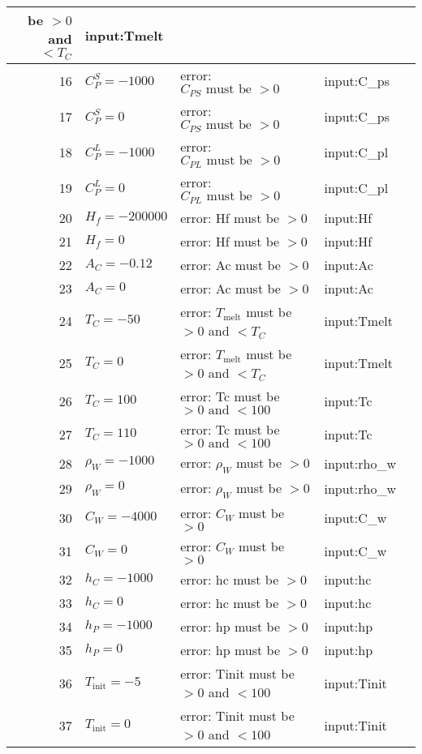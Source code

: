 \documentclass[12pt]{article}
\begin{document}
\begin{center}
\begin{longtable}{ | r | p{4cm} | p{4cm} | p{4cm} | p{4cm} |}
	 be $> 0$ and $< T_C$ &input:Tmelt \\ \hline
	16 & $C^S_P = -1000$ & error: $C_{PS} \text{ must be } > 0$ &input:C\_{ps} \\ \hline
	17 & $C^S_P = 0$ & error: $C_{PS} \text{ must be } > 0$ &input:C\_{ps} \\ \hline
	18 & $C^L_P = -1000$ & error: $C_{PL} \text{ must be } > 0$ &input:C\_{pl} \\ \hline
	19 & $C^L_P = 0$ & error: $C_{PL} \text{ must be } > 0$ &input:C\_{pl} \\ \hline
	20 & $H_f = -200000$& error: Hf must be $> 0$ & input:Hf \\ \hline
	21 & $H_f = 0$ & error: Hf must be $> 0$ & input:Hf \\ \hline
	22 & $A_C = -0.12$ & error: Ac must be $> 0$ &input:Ac \\ \hline
	23 & $A_C = 0$ & error: Ac must be $> 0$ &input:Ac \\ \hline
	24 & $T_C = -50$ & error: $T_{\text{melt}}$ must
	 be $> 0$ and $< T_C$ &input:Tmelt \\ \hline
	25 & $T_C = 0$ & error: $T_{\text{melt}}$ must
	 be $> 0$ and $< T_C$ &input:Tmelt \\ \hline
	26 & $T_C = 100$ & error: Tc must be $> 0 \text{ and } < 100$ &input:Tc \\ \hline
	27 & $T_C = 110$ & error: Tc must be $> 0 \text{ and } < 100$ &input:Tc \\ \hline
	28 & $\rho_W = -1000$ & error: $\rho_W$ must be $> 0$ &input:rho\_{w} \\ \hline
	29 & $\rho_W = 0$ & error: $\rho_W$ must be $> 0$ &input:rho\_{w} \\ \hline
	30 & $C_W = -4000$ & error: $C_W$ must be $> 0$ &input:C\_{w} \\ \hline
	31 & $C_W = 0$ & error: $C_W$ must be $> 0$ &input:C\_{w} \\ \hline
	32 & $h_C = -1000$ & error: hc must be $> 0$ &input:hc \\ \hline
	33 & $h_C = 0$ & error: hc must be $> 0$ &input:hc \\ \hline
	34 & $h_P = -1000$ & error: hp must be $> 0$ &input:hp \\ \hline
	35 & $h_P = 0$ & error: hp must be $> 0$ &input:hp \\ \hline
	36 & $T_{\text{init}} = -5$ & error: Tinit must be $> 0$ and $< 100$ &input:Tinit \\ \hline
	37 & $T_{\text{init}} = 0$ & error: Tinit must be $> 0$ and $< 100$ &input:Tinit \\ \hline

\end{longtable}
\end{center}
\end{document}
